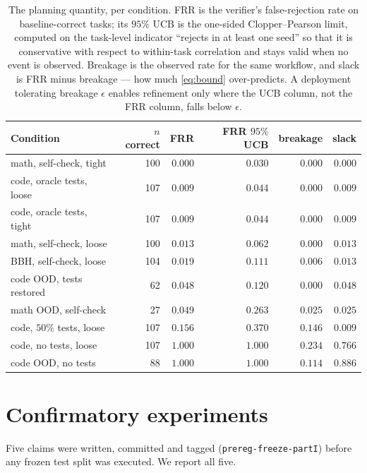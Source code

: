 \documentclass{article}
\begin{document}
\begin{table}[t]
\centering
\small
\caption{The planning quantity, per condition. FRR is the verifier's
false-rejection rate on baseline-correct tasks; its $95\%$ UCB is the one-sided
Clopper--Pearson limit, computed on the task-level indicator ``rejects in at
least one seed'' so that it is conservative with respect to within-task
correlation and stays valid when no event is observed. Breakage is the observed
rate for the same workflow, and slack is FRR minus breakage --- how much
\eqref{eq:bound} over-predicts. A deployment tolerating breakage $\epsilon$
enables refinement only where the UCB column, not the FRR column, falls below
$\epsilon$.}
\label{tab:frr}
\begin{tabular}{lrrrrr}
\toprule
Condition & $n$ correct & FRR & FRR $95\%$ UCB & breakage & slack \\
\midrule
math, self-check, tight & 100 & $0.000$ & $0.030$ & $0.000$ & $0.000$ \\
code, oracle tests, loose & 107 & $0.009$ & $0.044$ & $0.000$ & $0.009$ \\
code, oracle tests, tight & 107 & $0.009$ & $0.044$ & $0.000$ & $0.009$ \\
math, self-check, loose & 100 & $0.013$ & $0.062$ & $0.000$ & $0.013$ \\
BBH, self-check, loose & 104 & $0.019$ & $0.111$ & $0.006$ & $0.013$ \\
code OOD, tests restored & 62 & $0.048$ & $0.120$ & $0.000$ & $0.048$ \\
math OOD, self-check & 27 & $0.049$ & $0.263$ & $0.025$ & $0.025$ \\
code, $50\%$ tests, loose & 107 & $0.156$ & $0.370$ & $0.146$ & $0.009$ \\
code, no tests, loose & 107 & $1.000$ & $1.000$ & $0.234$ & $0.766$ \\
code OOD, no tests & 88 & $1.000$ & $1.000$ & $0.114$ & $0.886$ \\
\bottomrule
\end{tabular}
\end{table}



\section{Confirmatory experiments}
\label{sec:parti}

Five claims were written, committed and tagged (\texttt{prereg-freeze-partI})
before any frozen test split was executed. We report all five.
\end{document}
